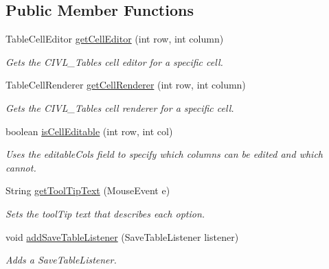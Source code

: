 \subsection*{Public Member Functions}
\begin{DoxyCompactItemize}
\item 
Table\+Cell\+Editor \hyperlink{classedu_1_1udel_1_1cis_1_1vsl_1_1civl_1_1gui_1_1common_1_1CIVLTable_a751bbda21449555f829a2765476b5178}{get\+Cell\+Editor} (int row, int column)
\begin{DoxyCompactList}\small\item\em Gets the {\ttfamily C\+I\+V\+L\+\_\+\+Table}\textquotesingle{}s cell editor for a specific cell. \end{DoxyCompactList}\item 
Table\+Cell\+Renderer \hyperlink{classedu_1_1udel_1_1cis_1_1vsl_1_1civl_1_1gui_1_1common_1_1CIVLTable_aeccb3757dcfa5dbe6d35e8a9066e8d95}{get\+Cell\+Renderer} (int row, int column)
\begin{DoxyCompactList}\small\item\em Gets the {\ttfamily C\+I\+V\+L\+\_\+\+Table}\textquotesingle{}s cell renderer for a specific cell. \end{DoxyCompactList}\item 
boolean \hyperlink{classedu_1_1udel_1_1cis_1_1vsl_1_1civl_1_1gui_1_1common_1_1CIVLTable_a7abc7eaa9c7a978d06307b6ad5429a25}{is\+Cell\+Editable} (int row, int col)
\begin{DoxyCompactList}\small\item\em Uses the editable\+Cols field to specify which columns can be edited and which cannot. \end{DoxyCompactList}\item 
String \hyperlink{classedu_1_1udel_1_1cis_1_1vsl_1_1civl_1_1gui_1_1common_1_1CIVLTable_a0cdeac46d4cada1e3ed8159e5f31d8af}{get\+Tool\+Tip\+Text} (Mouse\+Event e)
\begin{DoxyCompactList}\small\item\em Sets the tool\+Tip text that describes each option. \end{DoxyCompactList}\item 
void \hyperlink{classedu_1_1udel_1_1cis_1_1vsl_1_1civl_1_1gui_1_1common_1_1CIVLTable_a41c48015778719a8439d30819aed5e61}{add\+Save\+Table\+Listener} (Save\+Table\+Listener listener)
\begin{DoxyCompactList}\small\item\em Adds a Save\+Table\+Listener. \end{DoxyCompactList}\item 

\end{DoxyCompactItemize}
